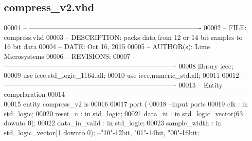 \subsection{compress\+\_\+v2.\+vhd}
\label{compress__v2_8vhd_source}

\begin{DoxyCode}
00001 \textcolor{keyword}{-- ---------------------------------------------------------------------------- }
00002 \textcolor{keyword}{-- FILE:    compress.vhd}
00003 \textcolor{keyword}{-- DESCRIPTION: packs data from 12 or 14 bit samples to 16 bit data}
00004 \textcolor{keyword}{-- DATE:    Oct 16, 2015}
00005 \textcolor{keyword}{-- AUTHOR(s):   Lime Microsystems}
00006 \textcolor{keyword}{-- REVISIONS:}
00007 \textcolor{keyword}{-- ---------------------------------------------------------------------------- }
00008 \textcolor{vhdlkeyword}{library }\textcolor{keywordflow}{ieee};
00009 \textcolor{vhdlkeyword}{use }ieee.std\_logic\_1164.\textcolor{keywordflow}{all};
00010 \textcolor{vhdlkeyword}{use }ieee.numeric\_std.\textcolor{keywordflow}{all};
00011 
00012 \textcolor{keyword}{-- ----------------------------------------------------------------------------}
00013 \textcolor{keyword}{-- Entity comprlaration}
00014 \textcolor{keyword}{-- ----------------------------------------------------------------------------}
00015 \textcolor{keywordflow}{entity }compress_v2 \textcolor{keywordflow}{is}
00016 
00017   \textcolor{keywordflow}{port} \textcolor{vhdlchar}{(}
00018 \textcolor{keyword}{        --input ports }
00019         \textcolor{vhdlchar}{clk}             \textcolor{vhdlchar}{:} \textcolor{keywordflow}{in} \textcolor{comment}{std\_logic};
00020         \textcolor{vhdlchar}{reset_n}         \textcolor{vhdlchar}{:} \textcolor{keywordflow}{in} \textcolor{comment}{std\_logic};
00021         \textcolor{vhdlchar}{data_in}         \textcolor{vhdlchar}{:} \textcolor{keywordflow}{in} \textcolor{comment}{std\_logic\_vector}\textcolor{vhdlchar}{(}\textcolor{vhdllogic}{}\textcolor{vhdllogic}{63} \textcolor{keywordflow}{downto} \textcolor{vhdllogic}{}\textcolor{vhdllogic}{0}\textcolor{vhdlchar}{)};
00022         \textcolor{vhdlchar}{data_in_valid}   \textcolor{vhdlchar}{:} \textcolor{keywordflow}{in} \textcolor{comment}{std\_logic};
00023         \textcolor{vhdlchar}{sample_width}    \textcolor{vhdlchar}{:} \textcolor{keywordflow}{in} \textcolor{comment}{std\_logic\_vector}\textcolor{vhdlchar}{(}\textcolor{vhdllogic}{}\textcolor{vhdllogic}{1} \textcolor{keywordflow}{downto} \textcolor{vhdllogic}{}\textcolor{vhdllogic}{0}\textcolor{vhdlchar}{)};\textcolor{keyword}{ --"10"-12bit, "01"-14bit, "00"-16bit;}

\end{DoxyCode}
